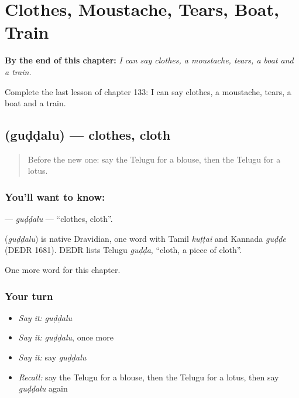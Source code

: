 
\chapter{Clothes, Moustache, Tears, Boat, Train}
\label{ch:te-clothes-moustache-tears-boat-train}

\begin{chapteropening}
\textbf{By the end of this chapter:} \emph{I can say clothes, a moustache, tears, a boat and a train.}

Complete the last lesson of chapter 133: I can say clothes, a moustache, tears, a boat and a train.
\end{chapteropening}

\section[\texorpdfstring{\te{గుడ్డలు} (guḍḍalu)}{గుడ్డలు (guḍḍalu)}]{ (guḍḍalu) — clothes, cloth}

\label{lesson:TE-C133-guddalu}



\begin{quote}
Before the new one: say the Telugu for a blouse, then the Telugu for a lotus.
\end{quote}

\subsection*{You'll want to know: }
\textbf{} — \emph{guḍḍalu} — \textquotedblleft{}clothes, cloth\textquotedblright{}.

\begin{cousinweb}
\textbf{} (\emph{guḍḍalu}) is native Dravidian, one word with Tamil \emph{kuṭṭai} and Kannada \emph{guḍḍe} (DEDR 1681). DEDR lists Telugu \emph{guḍḍa}, \textquotedblleft{}cloth, a piece of cloth\textquotedblright{}.
\end{cousinweb}

\begin{grammarlens}[title={What you've built}]
One more word for this chapter.
\end{grammarlens}

\subsection*{Your turn}
\begin{itemize}
\raggedright
  \item \emph{Say it:} \emph{guḍḍalu}
  \item \emph{Say it:} \emph{guḍḍalu}, once more
  \item \emph{Say it:} say \emph{guḍḍalu}
  \item \emph{Recall:} say the Telugu for a blouse, then the Telugu for a lotus, then say \emph{guḍḍalu} again
\end{itemize}

